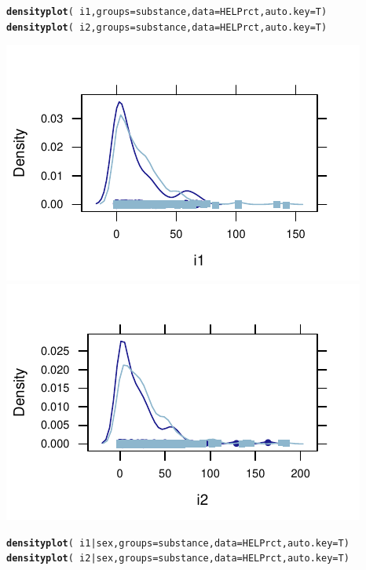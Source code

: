 \documentclass[twoside]{book}\usepackage[]{graphicx}\usepackage[]{xcolor}
\makeatletter
\def\maxwidth{ %
  \ifdim\Gin@nat@width>\linewidth
    \linewidth
  \else
    \Gin@nat@width
  \fi
}
\newcommand{\hlopt}[1]{\textcolor[rgb]{0,0,0}{#1}}%
\newcommand{\hlstd}[1]{\textcolor[rgb]{0.345,0.345,0.345}{#1}}%
\newcommand{\hlkwc}[1]{\textcolor[rgb]{0.333,0.667,0.333}{#1}}%
\newcommand{\hlkwd}[1]{\textcolor[rgb]{0.737,0.353,0.396}{\textbf{#1}}}%
\newenvironment{kframe}{%
 \def\at@end@of@kframe{}%
 \ifinner\ifhmode%
  \def\at@end@of@kframe{\end{minipage}}%
  \begin{minipage}{\columnwidth}%
 \fi\fi%
 \def\FrameCommand##1{\hskip\@totalleftmargin \hskip-\fboxsep
 \colorbox{shadecolor}{##1}\hskip-\fboxsep
     \hskip-\linewidth \hskip-\@totalleftmargin \hskip\columnwidth}%
 \MakeFramed {\advance\hsize-\width
   \@totalleftmargin\z@ \linewidth\hsize
   \@setminipage}}%
 {\par\unskip\endMakeFramed%
 \at@end@of@kframe}
\newenvironment{knitrout}{}{} %
\makeatother
\begin{document}
\begin{solution}
\begin{knitrout}
\color{fgcolor}\begin{kframe}
\begin{alltt}
\hlkwd{densityplot}\hlstd{(} \hlopt{~}\hlstd{i1,} \hlkwc{groups}\hlstd{=substance,} \hlkwc{data}\hlstd{=HELPrct ,} \hlkwc{auto.key}\hlstd{=T)}
\hlkwd{densityplot}\hlstd{(} \hlopt{~}\hlstd{i2,} \hlkwc{groups}\hlstd{=substance,} \hlkwc{data}\hlstd{=HELPrct ,} \hlkwc{auto.key}\hlstd{=T)}
\end{alltt}
\end{kframe}

{\centering \includegraphics[width=\maxwidth]{figures/fig-unnamed-chunk-35-1} 
\includegraphics[width=\maxwidth]{figures/fig-unnamed-chunk-35-2} 

}



\end{knitrout}
\begin{knitrout}
\color{fgcolor}\begin{kframe}
\begin{alltt}
\hlkwd{densityplot}\hlstd{(} \hlopt{~}\hlstd{i1}\hlopt{|}\hlstd{sex,} \hlkwc{groups}\hlstd{=substance,} \hlkwc{data}\hlstd{=HELPrct ,} \hlkwc{auto.key}\hlstd{=T)}
\hlkwd{densityplot}\hlstd{(} \hlopt{~}\hlstd{i2}\hlopt{|}\hlstd{sex,} \hlkwc{groups}\hlstd{=substance,} \hlkwc{data}\hlstd{=HELPrct ,} \hlkwc{auto.key}\hlstd{=T)}
\end{alltt}
\end{kframe}


\end{knitrout}
\end{solution}
\end{document}
